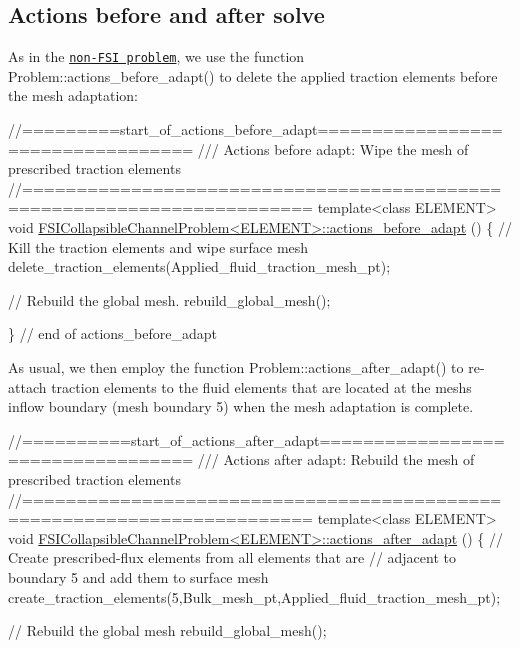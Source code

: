 \hypertarget{index_before_and_after}{}\subsection{Actions before and after solve}\label{index_before_and_after}
As in the \href{../../../navier_stokes/collapsible_channel/html/index.html}{\tt non-\/\+F\+SI problem}, we use the function {\ttfamily Problem\+::actions\+\_\+before\+\_\+adapt()} to delete the applied traction elements before the mesh adaptation\+:

 
\begin{DoxyCodeInclude}
\textcolor{comment}{//=========start\_of\_actions\_before\_adapt==================================}
\textcolor{comment}{/// Actions before adapt: Wipe the mesh of prescribed traction elements}
\textcolor{comment}{}\textcolor{comment}{//========================================================================}
\textcolor{keyword}{template}<\textcolor{keyword}{class} ELEMENT>
\textcolor{keywordtype}{void} \hyperlink{classFSICollapsibleChannelProblem_a91b30b3d0369c178d3a79f5658644f1b}{FSICollapsibleChannelProblem<ELEMENT>::actions\_before\_adapt}
      ()
\{
 \textcolor{comment}{// Kill the traction elements and wipe surface mesh}
 delete\_traction\_elements(Applied\_fluid\_traction\_mesh\_pt);
 
 \textcolor{comment}{// Rebuild the global mesh. }
 rebuild\_global\_mesh();

\} \textcolor{comment}{// end of actions\_before\_adapt}

\end{DoxyCodeInclude}


As usual, we then employ the function {\ttfamily Problem\+::actions\+\_\+after\+\_\+adapt()} to re-\/attach traction elements to the fluid elements that are located at the mesh\textquotesingle{}s inflow boundary (mesh boundary 5) when the mesh adaptation is complete.

 
\begin{DoxyCodeInclude}
\textcolor{comment}{//==========start\_of\_actions\_after\_adapt==================================}
\textcolor{comment}{/// Actions after adapt: Rebuild the mesh of prescribed traction elements}
\textcolor{comment}{}\textcolor{comment}{//========================================================================}
\textcolor{keyword}{template}<\textcolor{keyword}{class} ELEMENT>
\textcolor{keywordtype}{void} \hyperlink{classFSICollapsibleChannelProblem_ae20eb7ed895e0063ade5a6d0c6f9af2f}{FSICollapsibleChannelProblem<ELEMENT>::actions\_after\_adapt}
      ()
\{
 \textcolor{comment}{// Create prescribed-flux elements from all elements that are }
 \textcolor{comment}{// adjacent to boundary 5 and add them to surface mesh}
 create\_traction\_elements(5,Bulk\_mesh\_pt,Applied\_fluid\_traction\_mesh\_pt);

 \textcolor{comment}{// Rebuild the global mesh}
 rebuild\_global\_mesh();

\end{DoxyCodeInclude}



